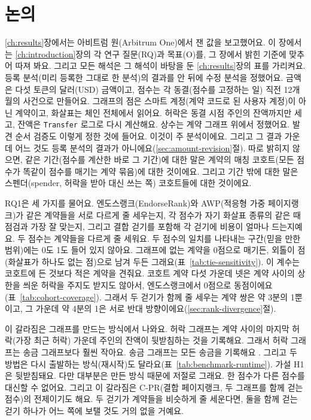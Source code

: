 \chapter{논의}
\label{ch:discussion}

\ref{ch:results}장에서는 아비트럼 원(Arbitrum One)에서 잰 값을 보고했어요. 이 장에서는 \ref{ch:introduction}장의 각 연구 질문(RQ)과 목표(O)를, 그 장에서 밝힌 기준에 맞추어 따져 봐요. 그리고 모든 해석은 그 해석이 바탕을 둔 \ref{ch:results}장의 표를 가리켜요. 등록 분석(미리 등록한 그대로 한 분석)의 결과를 안 뒤에 수정 분석을 정했어요. 금액은 다섯 토큰의 달러(USD) 금액이고, 점수는 각 동결(점수를 고정하는 일) 직전 12개월의 사건으로 만들어요. 그래프의 점은 스마트 계정(계약 코드로 된 사용자 계정)이 아닌 계약이고, 화살표는 체인 전체에서 읽어요. 허락은 동결 시점 주인의 잔액까지만 세고, 잔액은 \texttt{Transfer} 로그로 다시 계산해요. 상수는 계약 그래프 위에서 정했어요. 발견 순서 검증도 이렇게 정한 것에 들어요. 이것이 주 분석이에요. 그리고 그 결과 가운데 어느 것도 등록 분석의 결과가 아니에요(\ref{sec:amount-revision}절). 따로 밝히지 않으면, 같은 기간(점수를 계산한 바로 그 기간)에 대한 말은 계약의 매칭 코호트(모든 점수가 똑같이 점수를 매기는 계약 묶음)에 대한 것이에요. 그리고 기간 밖에 대한 말은 스펜더(spender, 허락을 받아 대신 쓰는 쪽) 코호트들에 대한 것이에요.



RQ1은 세 가지를 물어요. 엔도스랭크(EndorseRank)와 AWP(적응형 가중 페이지랭크)가 같은 계약들을 서로 다르게 줄 세우는지, 각 점수가 자기 화살표 종류의 같은 때 점검과 가장 잘 맞는지, 그리고 결합 걷기를 포함해 각 걷기에 비용이 얼마나 드는지예요. 두 점수는 계약들을 다르게 줄 세워요. 두 점수의 일치를 나타내는 구간(믿을 만한 범위)에는 0도 1도 들어 있지 않아요. 그래프에 없는 계약을 0점으로 매기든, 외톨이 점(화살표가 하나도 없는 점)으로 남겨 두든 그래요(표~\ref{tab:tie-sensitivity}). 이 계수는 코호트에 든 것보다 적은 계약을 견줘요. 코호트 계약 다섯 가운데 넷은 계약 사이의 상한을 씌운 허락을 주지도 받지도 않아서, 엔도스랭크에서 0점으로 동점이에요(표~\ref{tab:cohort-coverage}). 그래서 두 걷기가 함께 줄 세우는 계약 쌍은 약 3분의 1뿐이고, 그 가운데 약 4분의 1은 서로 반대 방향이에요(\ref{sec:rank-divergence}절).

이 갈라짐은 그래프를 만드는 방식에서 나와요. 허락 그래프는 계약 사이의 마지막 허락(가장 최근 허락) 가운데 주인의 잔액이 뒷받침하는 것을 기록해요. 그래서 허락 그래프는 송금 그래프보다 훨씬 작아요. 송금 그래프는 모든 송금을 기록해요 \parencite{do2023awp}. 그리고 두 방법은 다시 출발하는 방식(재시작)도 달라요(표~\ref{tab:benchmark-runtime}). 가설 H1은 뒷받침돼요. 다만 대부분은 만든 방식 때문에 저절로 그래요. 한 점수가 다른 점수를 대신할 수 없어요. 그리고 이 갈라짐은 \mbox{C-PR}(결합 페이지랭크, 두 그래프를 함께 걷는 점수)의 전제이기도 해요. 두 걷기가 계약들을 비슷하게 줄 세운다면, 둘을 함께 걷는 걷기 하나가 어느 쪽에 보탤 것도 거의 없을 거예요.

